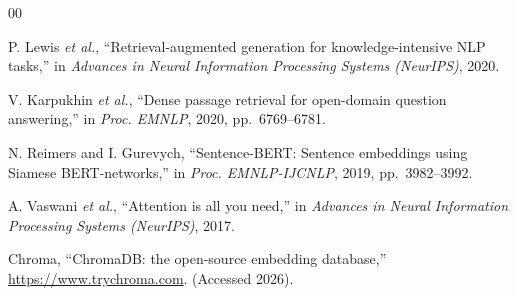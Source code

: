 \documentclass[journal]{IEEEtran}
\begin{document}
\begin{thebibliography}{00}

P. Lewis \textit{et al.}, ``Retrieval-augmented generation for
knowledge-intensive NLP tasks,'' in \textit{Advances in Neural
Information Processing Systems (NeurIPS)}, 2020.

V. Karpukhin \textit{et al.}, ``Dense passage retrieval for open-domain
question answering,'' in \textit{Proc. EMNLP}, 2020, pp.~6769--6781.

N. Reimers and I. Gurevych, ``Sentence-BERT: Sentence embeddings using
Siamese BERT-networks,'' in \textit{Proc. EMNLP-IJCNLP}, 2019,
pp.~3982--3992.

A. Vaswani \textit{et al.}, ``Attention is all you need,'' in
\textit{Advances in Neural Information Processing Systems (NeurIPS)},
2017.

Chroma, ``ChromaDB: the open-source embedding database,''
\url{https://www.trychroma.com}. (Accessed 2026).

\end{thebibliography}
\end{document}
